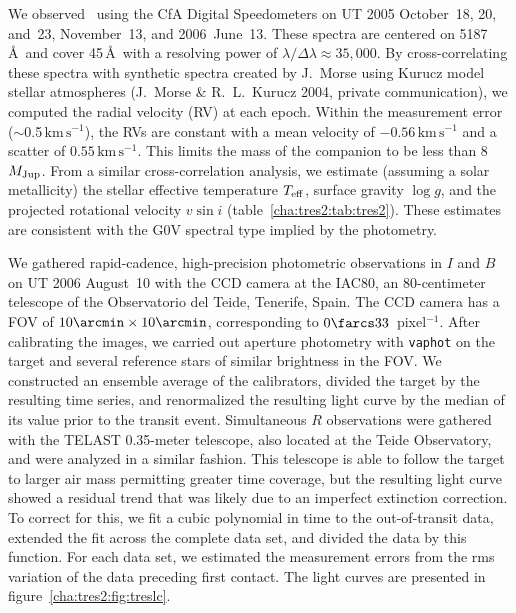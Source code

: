We observed
\tresTwo\ using the CfA Digital Speedometers \citep{Latham:ASP:1992a} on
UT 2005 October~18, 20, and~23, November~13, and 2006~June~13.
These spectra are centered on 5187\,\AA\ and cover 45\,\AA\ with
a resolving power of $\lambda / \Delta \lambda \approx 35,\!000$. By
cross-correlating these spectra with synthetic spectra created by
J.~Morse using Kurucz model stellar atmospheres (J.~Morse \&
R.~L.~Kurucz 2004, private communication), we computed the radial
velocity (RV) at each epoch. Within the measurement error 
($\sim$0.5\,$\mathrm{km\,s^{-1}}$), the RVs are
constant with a mean velocity of $-0.56\,\mathrm{km\,s^{-1}}$ and a 
scatter of $0.55\,\mathrm{km\,s^{-1}}$.
This limits the mass of the companion to be less than 8\,$M_{\rm Jup}$. 
From a similar cross-correlation analysis, we
estimate (assuming a solar metallicity) the stellar effective
temperature $T_{\rm eff}$, surface gravity $\log{g}$, and the
projected rotational velocity $v \sin{i}$ (table~\ref{cha:tres2:tab:tres2}).
These estimates are consistent with the G0V spectral type implied by
the photometry.

We gathered rapid-cadence, high-precision photometric observations in
$I$ and $B$ on UT 2006 August~10 with the CCD camera at the IAC80, an
80-centimeter telescope of the Observatorio del Teide, Tenerife, Spain. The
CCD camera has a FOV of $10\arcmin\times10\arcmin$, corresponding to
$0\farcs33$~pixel$^{-1}$. After calibrating the images, we carried out
aperture photometry with \texttt{vaphot} \citep{Deeg_Doyle:2001a} on the target
and several reference stars of similar brightness in the FOV.  We
constructed an ensemble average of the calibrators, divided the target
by the resulting time series, and renormalized the resulting light
curve by the median of its value prior to the transit event.
Simultaneous $R$ observations were gathered with the TELAST 0.35-meter
telescope, also located at the Teide Observatory, and were analyzed in
a similar fashion.  This telescope is able to follow the target to
larger air mass permitting greater time coverage, but the resulting
light curve showed a residual trend that was likely due to an
imperfect extinction correction. To correct for this, we fit a cubic
polynomial in time to the out-of-transit data, extended the fit across
the complete data set, and divided the data by this function. For each
data set, we estimated the measurement errors from the rms variation of
the data preceding first contact.  The light curves are presented in
figure~\ref{cha:tres2:fig:treslc}.

